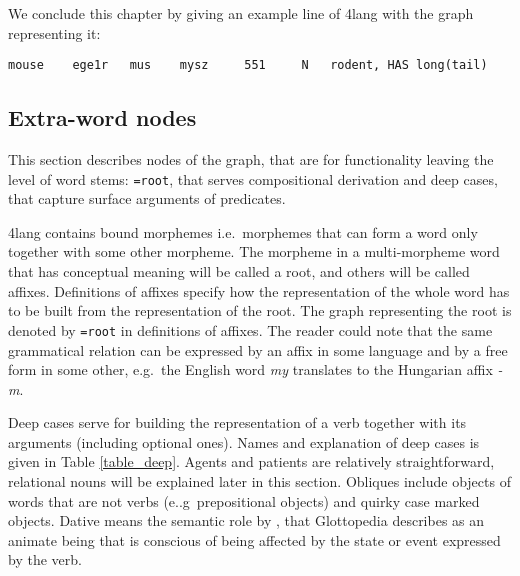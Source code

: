 \documentclass[a4paper,10pt]{article}
\begin{document}
We conclude this chapter by giving an example line of 4lang with the graph representing it:

\begin{verbatim}
mouse	 ege1r	 mus	mysz	 551	 N	 rodent, HAS long(tail)
\end{verbatim}
\subsection{Extra-word nodes}\label{sec_extraword}
This section describes nodes of the graph, that are for functionality leaving the level of word stems: \texttt{=root}, that serves compositional derivation and deep cases, that capture surface arguments of predicates.

4lang contains bound morphemes i.e.\ morphemes that can form a word only together with some other morpheme. The morpheme in a multi-morpheme word that has conceptual meaning will be called a root, and others will be called affixes. Definitions of affixes specify how the representation of the whole word has to be built from the representation of the root. The graph representing the root is denoted by \texttt{=root} in definitions of affixes. The reader could note that the same grammatical relation can be expressed by an affix in some language and by a free form in some other, e.g.\ the English word \emph{my} translates to the Hungarian affix \emph{-m}. %

Deep cases serve for building the representation of a verb together with its arguments (including optional ones). Names and explanation of deep cases is given in Table \ref{table_deep}.
Agents and patients are relatively straightforward, relational nouns will be explained later in this section. Obliques include objects of words that are not verbs (e..g\ prepositional objects) and quirky case marked objects. {{Dative means the semantic role by \cite{Fillmore:1968}, that Glottopedia describes as an animate being that is conscious of being affected by the state or event expressed by the verb.}}%
\end{document}
